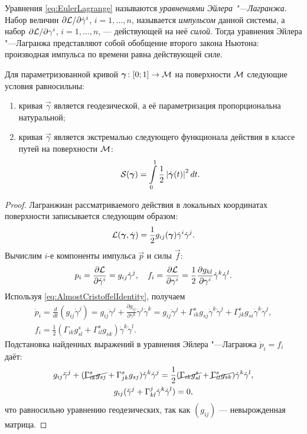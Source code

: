 Уравнения \eqref{eq:EulerLagrange} называются \textit{уравнениями Эйлера "---Лагранжа}. Набор величин $\partial\mathcal{L} / \partial\dot{\gamma}^i$, $i = 1, \ldots, n$, называется \textit{импульсом} данной системы, а набор $\partial\mathcal{L} / \partial\gamma^i$, $i = 1, \ldots, n$, --- действующей на неё \textit{силой}. Тогда уравнения Эйлера "---Лагранжа представляют собой обобщение второго закона Ньютона: производная импульса по времени равна действующей силе.

\begin{theorem} \label{theorem:GeodesicExtremal}
	Для параметризованной кривой $\boldsymbol{\gamma}\colon [0; 1] \to \mathcal{M}$ на поверхности $\mathcal{M}$ следующие условия равносильны:
	\begin{enumerate}[nolistsep, label=(\arabic*)]
		\item кривая $\vec{\gamma}$ является геодезической, а её параметризация пропорциональна натуральной;
		\item кривая $\vec{\gamma}$ является экстремалью следующего функционала действия в классе путей на поверхности $\mathcal{M}$:
			\[
				\mathcal{S}(\boldsymbol{\gamma}) = \int\limits_0^1\frac{1}{2}\left\lvert\dot{\boldsymbol{\gamma}}(t)\right\rvert^2dt.
			\]
	\end{enumerate}
\end{theorem}

\begin{proof}
	Лагранжиан рассматриваемого действия в локальных координатах поверхности записывается следующим образом:
	\[
		\mathcal{L}(\boldsymbol{\gamma}, \dot{\boldsymbol{\gamma}}) = \frac{1}{2}g_{ij}(\boldsymbol{\gamma})\dot{\gamma}^i\dot{\gamma}^j.
	\]
	Вычислим $i$-е компоненты импульса $\vec{p}$ и силы $\vec{f}$:
	\[
		p_i = \frac{\partial\mathcal{L}}{\partial\dot{\gamma}^i} = g_{ij}\dot{\gamma}^j,\quad f_i = \frac{\partial\mathcal{L}}{\partial\gamma^i} = \frac{1}{2}\frac{\partial g_{kl}}{\partial\gamma^i}\dot{\gamma}^k\dot{\gamma}^l.
	\]
	Используя \eqref{eq:AlmostCristoffelIdentity}, получаем
	\begin{gather*}
		\dot{p}_i = \frac{d}{dt}(g_{ij}\dot{\gamma}^j) = g_{ij}\ddot{\gamma}^j + \frac{\partial g_{ij}}{\partial\gamma^k}\dot{\gamma}^j\dot{\gamma}^k = g_{ij}\ddot{\gamma}^j + \Gamma_{ik}^sg_{sj}\dot{\gamma}^k\dot{\gamma}^j + \Gamma_{jk}^sg_{si}\dot{\gamma}^k\dot{\gamma}^j,\\
		f_i = \frac{1}{2}(\Gamma_{ik}g_{sl}^s + \Gamma_{il}^sg_{sk})\dot{\gamma}^k\dot{\gamma}^l.
	\end{gather*}
	Подстановка найденных выражений в уравнения Эйлера "---Лагранжа $\dot{p}_i = f_i$ даёт:
	\begin{gather*}
		g_{ij}\ddot{\gamma}^j + (\cancel{\Gamma_{ik}^sg_{sj}} + \Gamma_{jk}^sg_{sj})\dot{\gamma}^k\dot{\gamma}^j = \frac{1}{2}(\cancel{\Gamma_{ik}g_{sl}^s} + \cancel{\Gamma_{il}^sg_{sk}})\dot{\gamma}^k\dot{\gamma}^l,\\
		g_{ij}(\ddot{\gamma}^j + \Gamma_{kl}^j\dot{\gamma}^k\dot{\gamma}^l) = 0,
	\end{gather*}
	что равносильно уравнению геодезических, так как $(g_{ij})$ --- невырожденная матрица.
\end{proof}

